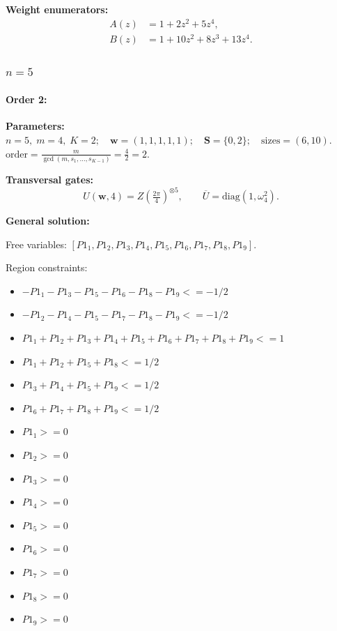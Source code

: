\documentclass[11pt]{article}
\begin{document}
\noindent\textbf{Weight enumerators:}
\begin{align*}
A(z) &= 1 + 2z^{2} + 5z^{4},\\[2pt]
B(z) &= 1 + 10z^{2} + 8z^{3} + 13z^{4}.
\end{align*}

\subsubsection{$n=5$}
\label{subsubsec:K2n5}
\paragraph{\textbf{Order 2:}}
\noindent\textbf{Parameters:} $n=5,\; m=4,\; K=2;\quad \mathbf w=(1, 1, 1, 1, 1);\quad \mathbf S=\{0, 2\};\quad \text{sizes}=\left(6, 10\right).$ $\displaystyle \text{order}=\frac{m}{\gcd(m,s_1,\dots,s_{K-1})}=\frac{4}{2}=2.$

\noindent\textbf{Transversal gates:}
\[
    U(\mathbf w,4)=Z \left(\tfrac{2\pi}{4}\right)^{\otimes5},\qquad
    \overline U=\mathrm{diag}(1,\omega_4^{2}).
\]

\noindent\textbf{General solution:}

Free variables: $[P1_1, P1_2, P1_3, P1_4, P1_5, P1_6, P1_7, P1_8, P1_9]$.

Region constraints:
\begin{itemize}
    \item $-P1_1 - P1_3 - P1_5 - P1_6 - P1_8 - P1_9 <= -1/2$
    \item $-P1_2 - P1_4 - P1_5 - P1_7 - P1_8 - P1_9 <= -1/2$
    \item $P1_1 + P1_2 + P1_3 + P1_4 + P1_5 + P1_6 + P1_7 + P1_8 + P1_9 <= 1$
    \item $P1_1 + P1_2 + P1_5 + P1_8 <= 1/2$
    \item $P1_3 + P1_4 + P1_5 + P1_9 <= 1/2$
    \item $P1_6 + P1_7 + P1_8 + P1_9 <= 1/2$
    \item $P1_1 >= 0$
    \item $P1_2 >= 0$
    \item $P1_3 >= 0$
    \item $P1_4 >= 0$
    \item $P1_5 >= 0$
    \item $P1_6 >= 0$
    \item $P1_7 >= 0$
    \item $P1_8 >= 0$
    \item $P1_9 >= 0$
\end{itemize}
\end{document}
